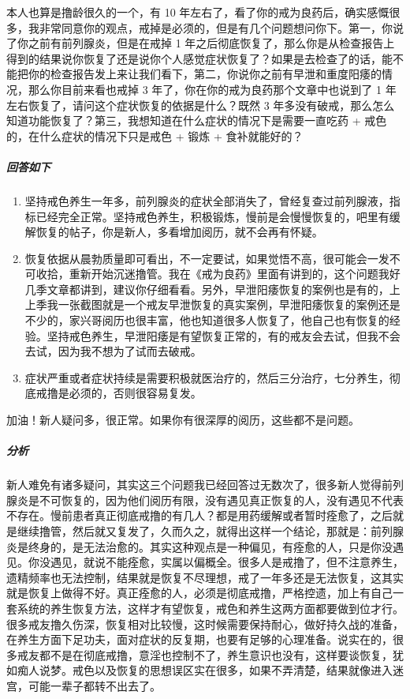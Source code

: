\begin{case}
    本人也算是撸龄很久的一个，有 10 年左右了，看了你的戒为良药后，确实感慨很多，我非常同意你的观点，戒掉是必须的，但是有几个问题想问你下。第一，你说了你之前有前列腺炎，但是在戒掉 1 年之后彻底恢复了，那么你是从检查报告上得到的结果说你恢复了还是说你个人感觉症状恢复了？如果是去检查了的话，能不能把你的检查报告发上来让我们看下，第二，你说你之前有早泄和重度阳痿的情况，那么你目前来看也戒掉 3 年了，你在你的戒为良药那个文章中也说到了 1 年左右恢复了，请问这个症状恢复的依据是什么？既然 3 年多没有破戒，那么怎么知道功能恢复了？第三，我想知道在什么症状的情况下是需要一直吃药 + 戒色的，在什么症状的情况下只是戒色 + 锻炼 + 食补就能好的？
    \subparagraph{回答如下} \begin{enumerate}
        \item 坚持戒色养生一年多，前列腺炎的症状全部消失了，曾经复查过前列腺液，指标已经完全正常。坚持戒色养生，积极锻炼，慢前是会慢慢恢复的，吧里有缓解恢复的帖子，你是新人，多看增加阅历，就不会再有怀疑。
        \item 恢复依据从晨勃质量即可看出，不一定要试，如果觉悟不高，很可能会一发不可收拾，重新开始沉迷撸管。我在《戒为良药》里面有讲到的，这个问题我好几季文章都讲到，建议你仔细看看。另外，早泄阳痿恢复的案例也是有的，上上季我一张截图就是一个戒友早泄恢复的真实案例，早泄阳痿恢复的案例还是不少的，家兴哥阅历也很丰富，他也知道很多人恢复了，他自己也有恢复的经验。坚持戒色养生，早泄阳痿是有望恢复正常的，有的戒友会去试，但我不会去试，因为我不想为了试而去破戒。
        \item 症状严重或者症状持续是需要积极就医治疗的，然后三分治疗，七分养生，彻底戒撸是必须的，否则很容易复发。
    \end{enumerate}
    加油！新人疑问多，很正常。如果你有很深厚的阅历，这些都不是问题。
    \subparagraph{分析} 新人难免有诸多疑问，其实这三个问题我已经回答过无数次了，很多新人觉得前列腺炎是不可恢复的，因为他们阅历有限，没有遇见真正恢复的人，没有遇见不代表不存在。慢前患者真正彻底戒撸的有几人？都是用药缓解或者暂时痊愈了，之后就是继续撸管，然后就又复发了，久而久之，就得出这样一个结论，那就是：前列腺炎是终身的，是无法治愈的。其实这种观点是一种偏见，有痊愈的人，只是你没遇见。你没遇见，就说不能痊愈，实属以偏概全。很多人是戒撸了，但不注意养生，遗精频率也无法控制，结果就是恢复不尽理想，戒了一年多还是无法恢复，这其实就是恢复上做得不好。真正痊愈的人，必须是彻底戒撸，严格控遗，加上有自己一套系统的养生恢复方法，这样才有望恢复，戒色和养生这两方面都要做到位才行。很多戒友撸久伤深，恢复相对比较慢，这时候需要保持耐心，做好持久战的准备，在养生方面下足功夫，面对症状的反复期，也要有足够的心理准备。说实在的，很多戒友都不是在彻底戒撸，意淫也控制不了，养生意识也没有，这样要谈恢复，犹如痴人说梦。戒色以及恢复的思想误区实在很多，如果不弄清楚，结果就像进入迷宫，可能一辈子都转不出去了。\\

\end{case}
